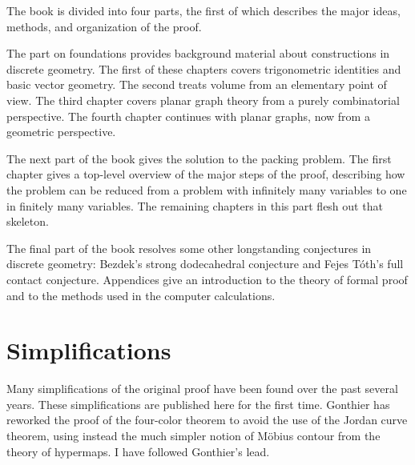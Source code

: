 The book is divided into four parts, the first of which
 describes the major ideas, methods, and
organization of the proof.  


The part on foundations provides background material about
constructions in discrete geometry.  The first of these chapters
covers trigonometric identities and basic vector geometry.  The second
treats volume from an elementary point of view.  The third chapter
covers planar graph theory from a purely combinatorial perspective.
The fourth chapter continues with planar graphs, now from a geometric
perspective.

The next part of the book gives the solution to the packing problem.
The first chapter  gives a top-level overview of the major
steps of the proof,   describing how the problem can be reduced from
a problem with infinitely many variables to one in finitely many
variables.  The remaining chapters in this part flesh out that
skeleton.

The final part of the book resolves some other longstanding conjectures in
discrete geometry: Bezdek's strong dodecahedral conjecture and Fejes
T\'oth's full contact conjecture.  Appendices give an introduction to
the theory of formal proof and to the methods used in the computer calculations.

\section*{Simplifications}

Many simplifications of the original proof have been found over the
past several years.  These simplifications are published here for the
first time.  Gonthier has reworked the proof of the four-color
theorem to avoid the use of the Jordan curve theorem, using instead
the much simpler notion of M\"obius contour from the theory of
hypermaps.  I have followed Gonthier's lead.


